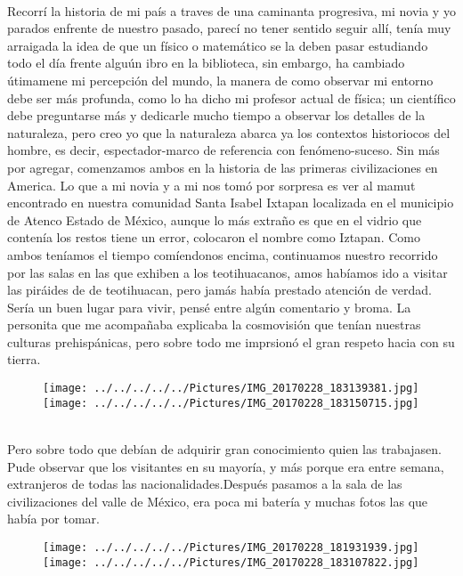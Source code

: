 \documentclass[10pt,a4paper]{article}
\begin{document}
\\
Recorr\'{i} la historia de mi pa\'{i}s a traves de una caminanta progresiva, mi novia y yo parados enfrente de nuestro pasado, parec\'{i} no tener sentido seguir all\'{i}, ten\'{i}a muy arraigada la idea de que un f\'{i}sico o matem\'{a}tico se la deben pasar estudiando todo el d\'{i}a frente algu\'{u}n ibro en la biblioteca, sin embargo, ha cambiado \'{u}timamene mi percepci\'{o}n del mundo, la manera de como observar mi entorno debe ser m\'{a}s profunda, como lo ha dicho mi profesor actual de f\'{i}sica; un cient\'{i}fico debe preguntarse m\'{a}s y dedicarle mucho tiempo a observar los detalles de la naturaleza, pero creo yo que la naturaleza abarca ya los contextos historiocos del hombre, es decir, espectador-marco de referencia con fen\'{o}meno-suceso. Sin m\'{a}s por agregar, comenzamos ambos en la historia de las primeras civilizaciones en America. Lo que a mi novia y a mi nos tom\'{o} por sorpresa es ver al mamut encontrado en nuestra comunidad Santa Isabel Ixtapan localizada en el municipio de Atenco Estado de M\'{e}xico, aunque lo m\'{a}s extra\~{n}o es que en el vidrio que conten\'{i}a los restos tiene un error, colocaron el nombre como Iztapan. Como ambos ten\'{i}amos el tiempo com\'{i}endonos encima, continuamos nuestro recorrido por las salas en las que exhiben a los teotihuacanos, amos hab\'{i}amos ido a visitar las pir\'{a}ides de de teotihuacan, pero jam\'{a}s hab\'{i}a prestado atenci\'{o}n de verdad. Ser\'{i}a un buen lugar para vivir, pens\'{e} entre alg\'{u}n comentario y broma. La personita que me acompa\~{n}aba explicaba la cosmovisi\'{o}n que ten\'{i}an nuestras culturas prehisp\'{a}nicas, pero sobre todo me imprsion\'{o} el gran respeto hacia con su tierra.\\
\begin{figure}[hbtp]
\centering
\texttt{[image: ../../../../../Pictures/IMG\_20170228\_183139381.jpg]} 
\texttt{[image: ../../../../../Pictures/IMG\_20170228\_183150715.jpg]}  
\end{figure}
\\
Pero sobre todo que deb\'{i}an de adquirir gran conocimiento quien las trabajasen. Pude observar que los visitantes en su mayor\'{i}a, y m\'{a}s porque era entre semana, extranjeros de todas las nacionalidades.Despu\'{e}s pasamos a la sala de las civilizaciones del valle de M\'{e}xico, era poca mi bater\'{i}a y muchas fotos las que hab\'{i}a por tomar.\\
\begin{figure}[hbtp]
\centering 
\texttt{[image: ../../../../../Pictures/IMG\_20170228\_181931939.jpg]} 
\texttt{[image: ../../../../../Pictures/IMG\_20170228\_183107822.jpg]} 
\end{figure}
\end{document}
